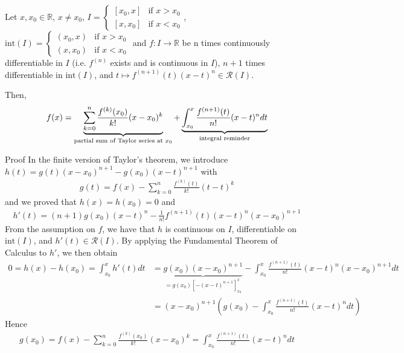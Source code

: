 \documentclass{tufte-handout}
\begin{document}
\begin{Theorem}
    Let \( x, x_0 \in \mathbb{R} \), \( x \neq x_0 \), 
    \(I = \begin{cases}
        [x_0, x] & \text{if } x > x_0\\
        [x, x_0] & \text{if } x < x_0
    \end{cases}\), 
    \( \text{int}(I) = \begin{cases}
        (x_0, x) & \text{if } x > x_0\\
        (x, x_0) & \text{if } x < x_0
    \end{cases} \) and \( f: I \to \mathbb{R} \) be 
    n times continuously differentiable in \( I \) (i.e. 
    \( f^{(n) } \) exists and is continuous in \( I \)),
    \( n+1 \) times differentiable in \( \text{int}(I) \),
    and \( t\mapsto f^{(n+1)}(t)(x-t)^n \in \mathcal{R}(I) \).

    Then, 
    \begin{align}
        f(x) = \underbrace{\sum_{k=0}^{n}\frac{f^{(k)}(x_0)}{k!}(x-x_0)^k}_{\text{partial sum of Taylor series at \( x_0 \)}} 
        + \underbrace{\int_{x_0}^x\frac{f^{(n+1)}(t)}{n!}(x-t)^ndt}_{\text{integral reminder}}
    \end{align}
\end{Theorem}
Proof
In the finite version of Taylor's theorem, 
we introduce \( h(t) = g(t)(x-x_0)^{n+1}-g(x_0)(x-t)^{n+1} \)
with \begin{align}
    g(t) = f(x) - \sum_{k=0}^{n}\frac{f^{(k)}(t)}{k!}(t-t)^k
\end{align}
and we proved that \( h(x) = h(x_0) = 0 \) and 
\begin{align}
    h'(t) = (n+1)g(x_0)(x-t)^n - \frac{1}{n!} f^{(n+1)}(t)(x-t)^n(x-x_0)^{n+1}
\end{align}
From the assumption on \( f \), we have that \( h \)
is continuous on \( I \), differentiable on \( \text{int}(I) \), and 
\(h'(t) \in \mathcal{R}(I)\). By applying the Fundamental 
Theorem of Calculus to \( h' \), we then obtain
\begin{align}
    0 = h(x) - h(x_0) = 
    \int_{x_0}^x h'(t) dt &= \underbrace{g(x_0)(x-x_0)^{n+1}}_{=g(x_0)\left[-(x-t)^{n+1}
    \right]_{x_0}^x} - \int_{x_0}^x\frac{f^{(n+1)}(t)}{n!}(x-t)^n(x-x_0)^{n+1}dt\\
    &= (x-x_0)^{n+1} \left(g(x_0) - \int_{x_0}^x\frac{f^{(n+1)}(t)}{n!}(x-t)^ndt\right)
\end{align}
Hence
\begin{align}
    g(x_0) = f(x) - \sum_{k=0}^{n}\frac{f^{(k)}(x_0)}{k!}(x-x_0)^k = \int_{x_0}^x\frac{f^{(n+1)}(t)}{n!}(x-t)^ndt
\end{align}
\hfill \qedsymbol
\end{document}
